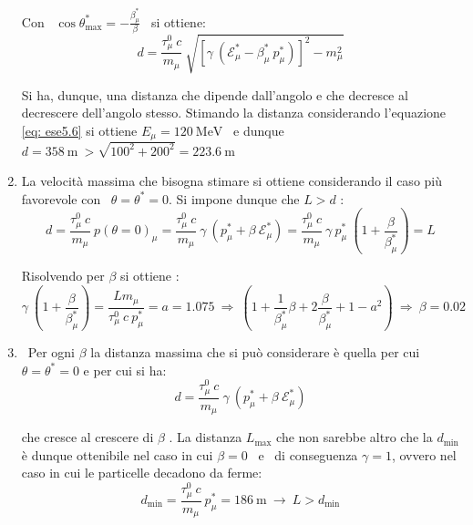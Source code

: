 \documentclass[12pt,twoside,a4]{article}
\begin{document}
\begin{solution}
\begin{enumerate}[label=(\textit{\roman*})]
Con \ $\cos{\theta^\ast_{\mathrm{max}}}= -\frac{\beta^\ast_\mu}{\beta}$ \ si ottiene: 
\begin{equation}
\label{eq: ese5.6}
 d = \frac{ \tau^0_\mu \ c}{m_\mu} \ \sqrt{[\gamma \ (\mathcal{E}^\ast_\mu - \beta^\ast_\mu \ p^\ast_\mu )]^{2} - m^2_\mu}   
\end{equation}

Si ha, dunque, una distanza che dipende dall'angolo e che decresce al decrescere dell'angolo stesso. 
Stimando la distanza considerando l'equazione \ref{eq: ese5.6} si ottiene $E_\mu = 120 \ \mathrm{MeV}$ \ e dunque \ $d = 358 \ \mathrm{m} \ > \sqrt{100^2 + 200^2} = 223.6 \ \mathrm{m} $

\item La velocità massima che bisogna stimare si ottiene considerando il caso più favorevole con \ $\theta = \theta^\ast = 0$. 
Si impone dunque che $L > d $ : \begin{equation*}
d =  \frac{ \tau^0_\mu \ c}{m_\mu} \  p(\theta= 0)_\mu =\frac{ \tau^0_\mu \ c}{m_\mu} \ \gamma \ (p^\ast_\mu + \beta \ \mathcal{E}^\ast_\mu) = \frac{ \tau^0_\mu \ c}{m_\mu} \ \gamma \ p^\ast_\mu  \ \left(1 + \frac{\beta}{\beta^\ast_\mu}\right) = L   
\end{equation*}

Risolvendo per $\beta$ si ottiene : \begin{equation*}
 \gamma \ \left(1 + \frac{\beta}{\beta^\ast_\mu}\right) = \frac{L m_\mu}{\tau^0_\mu \ c \ p^\ast_\mu } = a = 1.075  \  \Rightarrow  \  \left(1 + \frac{1}{\beta^\ast_\mu} \beta + 2 \frac{\beta}{\beta^\ast_\mu} + 1 - a^2  \right)  \  \Rightarrow  \  \beta = 0.02  
\end{equation*}

\item \ Per ogni $\beta $ la distanza massima che si può considerare è quella per cui $\theta = \theta^\ast = 0$ e per cui si ha: \begin{equation*}
 d =  \frac{ \tau^0_\mu \ c}{m_\mu} \ \gamma \ (p^\ast_\mu + \beta \ \mathcal{E}^\ast_\mu)  
\end{equation*}

che cresce al crescere di $\beta$ . La distanza $L_{\mathrm{max}}$ che non sarebbe altro che la $d_\mathrm{min}$ è dunque ottenibile nel caso in cui $\beta = 0$ \ e \ di conseguenza $\gamma = 1$, ovvero nel caso in cui le particelle decadono da ferme: \begin{equation*}
 d_{\mathrm{min}} = \frac{ \tau^0_\mu \ c}{m_\mu} \ p^\ast_\mu = 186 \ \mathrm{m}  \  \rightarrow  \   L > d_{\mathrm{min}} 
\end{equation*} 
\end{enumerate}
\end{solution}
\end{document}
